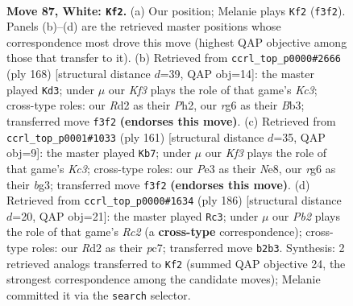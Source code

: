 \documentclass[11pt]{article}
\begin{document}
\clearpage

\begin{figure}[p]\centering
\begin{subfigure}{0.46\textwidth}\centering
\resizebox{\linewidth}{!}{%
\newchessgame
\chessboard[
  setfen={8/8/p3k1r1/Ppp2p1p/2p2P1P/4PKP1/1P1R4/8 w - - 19 87},
  showmover=false,
  pgfstyle=straightmove, color=movearrow, markmove={f3-f2}
]}
\caption{}
\end{subfigure}\hfill
\begin{subfigure}{0.46\textwidth}\centering
\resizebox{\linewidth}{!}{%
\newchessgame
\chessboard[
  setfen={2b5/5p2/1p1k3p/pP1p1p2/P2P1P2/1BK3P1/7P/8 w - - 5 85},
  showmover=false,
  pgfstyle=straightmove, color=movearrow, markmove={c3-d3}
]}
\caption{}
\end{subfigure}
\\[4pt]
\begin{subfigure}{0.46\textwidth}\centering
\resizebox{\linewidth}{!}{%
\newchessgame
\chessboard[
  setfen={4n3/3r4/2kp2p1/1p5p/1Pp1P2P/2K2PB1/6P1/R7 b - - 19 81},
  showmover=false,
  pgfstyle=straightmove, color=movearrow, markmove={c6-b7}
]}
\caption{}
\end{subfigure}\hfill
\begin{subfigure}{0.46\textwidth}\centering
\resizebox{\linewidth}{!}{%
\newchessgame
\chessboard[
  setfen={8/2p5/3p2pk/r2Pp1p1/2P1P3/5PKP/2R5/8 w - - 5 94},
  showmover=false,
  pgfstyle=straightmove, color=movearrow, markmove={c2-c3}
]}
\caption{}
\end{subfigure}
\caption{\textbf{Move 87, White: \texttt{Kf2}.} (a) Our position; Melanie plays \texttt{Kf2} (\texttt{f3f2}). Panels (b)--(d) are the retrieved master positions whose correspondence most drove this move (highest QAP objective among those that transfer to it). (b) Retrieved from \texttt{ccrl\_top\_p0000\#2666} (ply 168) [structural distance $d$=39, QAP obj=14]: the master played \texttt{Kd3}; under $\mu$ our \emph{Kf3} plays the role of that game's \emph{Kc3}; cross-type roles: our \emph{R}d2 as their \emph{P}h2, our \emph{r}g6 as their \emph{B}b3; transferred move \texttt{f3f2} \textbf{(endorses this move)}. (c) Retrieved from \texttt{ccrl\_top\_p0001\#1033} (ply 161) [structural distance $d$=35, QAP obj=9]: the master played \texttt{Kb7}; under $\mu$ our \emph{Kf3} plays the role of that game's \emph{Kc3}; cross-type roles: our \emph{P}e3 as their \emph{N}e8, our \emph{r}g6 as their \emph{b}g3; transferred move \texttt{f3f2} \textbf{(endorses this move)}. (d) Retrieved from \texttt{ccrl\_top\_p0000\#1634} (ply 186) [structural distance $d$=20, QAP obj=21]: the master played \texttt{Rc3}; under $\mu$ our \emph{Pb2} plays the role of that game's \emph{Rc2} (a \textbf{cross-type} correspondence); cross-type roles: our \emph{R}d2 as their \emph{p}c7; transferred move \texttt{b2b3}. Synthesis: 2 retrieved analogs transferred to \texttt{Kf2} (summed QAP objective 24, the strongest correspondence among the candidate moves); Melanie committed it via the \texttt{search} selector.}
\label{fig:thought-m172}
\end{figure}
\end{document}
